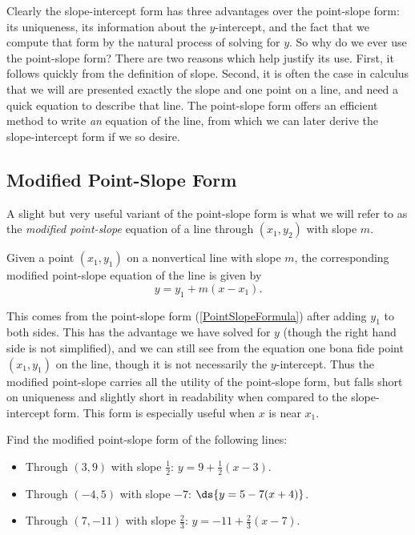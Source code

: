 Clearly the slope-intercept form has three advantages over
the point-slope form:  its uniqueness, its information about
the $y$-intercept, and the fact that we compute that form
by the natural process of solving for $y$.  So why do we
ever use the point-slope form?  There are two reasons which
help justify its use.  First, it follows quickly from the
definition of slope.  Second, it is often the case 
in calculus that  we will are presented exactly the slope
and one point on a line, and need a quick equation to describe
that line.  The point-slope
form offers an efficient method to write {\it an} equation of the
line, from which we can later derive the slope-intercept form
if we so desire.  

\subsection{Modified Point-Slope Form}
A slight but very useful variant of the point-slope form
is what we will refer to as the {\it modified point-slope}
equation of a line through $(x_1,y_2)$ with slope $m$.
\begin{definition} Given a point $(x_1,y_1)$ on a nonvertical
line with slope $m$, the corresponding {\rm modified point-slope}
equation of the line is given by
\begin{equation}
y=y_1+m(x-x_1).\label{ModifiedPointSLope}
\end{equation}\end{definition}
This comes from the point-slope form (\ref{PointSlopeFormula}) after
adding $y_1$ to both sides.  This has the advantage we
have solved for $y$ (though the right hand side is not 
simplified), and we can still see from the equation
one bona fide  point $(x_1,y_1)$ 
on the line, though it is not necessarily the $y$-intercept.
Thus the modified point-slope carries all the utility of
the point-slope form, but falls short on uniqueness and
slightly short in readability when compared to the slope-intercept
form.  This form is especially useful when $x$ is near $x_1$.

\bex Find the modified point-slope form of the following lines:
\begin{itemize}
\item Through $(3,9)$ with slope $\frac12$: \qquad 
  ${y=9+\frac12(x-3)}$.
\item Through $(-4,5)$ with slope $-7$: \qquad  $\ds{y=5-7(x+4)}$.
\item Through $(7,-11)$ with slope $\frac23$: \qquad
  $y=-11+\frac23(x-7).$
\end{itemize}
\eex

